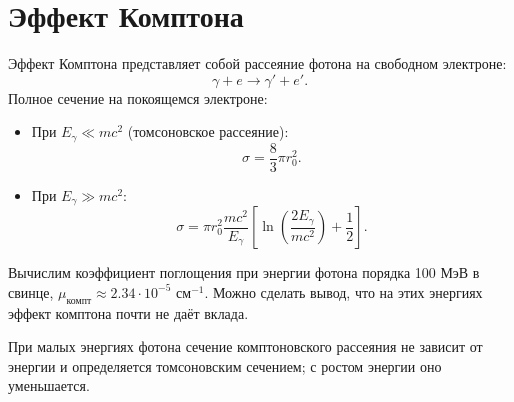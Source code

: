 \documentclass[14pt, a4paper]{extreport}
\begin{document}
\section{Эффект Комптона}
Эффект Комптона представляет собой рассеяние фотона на свободном электроне:
\begin{equation}
    \gamma + e \rightarrow \gamma' + e'.
\end{equation}
Полное сечение на покоящемся электроне:
\begin{itemize}
    \item При $E_{\gamma} \ll mc^2$ (томсоновское рассеяние):
    \begin{equation}
        \label{eq:thomson_scattering}
        \sigma = \frac{8}{3}\pi r_0^2.
    \end{equation}
    \item При $E_{\gamma} \gg mc^2$:
    \begin{equation}
        \label{eq:compt_scattering}
        \sigma = \pi r_0^2 \frac{mc^2}{E_{\gamma}} \left[ \ln\left( \frac{2E_{\gamma}}{mc^2} \right) + \frac{1}{2} \right].
    \end{equation}
\end{itemize}
Вычислим коэффициент поглощения при энергии фотона порядка 100 МэВ в свинце, $\mu_{\text{компт}} \approx 2.34 \cdot 10^{-5}$ см$^{-1}$. Можно сделать вывод, что на этих энергиях эффект комптона почти не даёт вклада.

При малых энергиях фотона сечение комптоновского рассеяния не зависит от энергии и определяется томсоновским сечением; с ростом энергии оно уменьшается.
\end{document}
